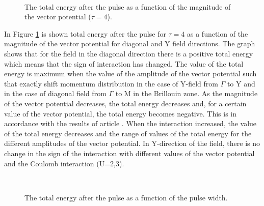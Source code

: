 \begin{figure}[h!]
 \\
\caption{The total energy after the pulse as a function of the magnitude of the vector potential ($\tau = 4$).}
\label{fig:E_tot_A}
\end{figure}

In Figure \ref{fig:E_tot_A} is shown total energy after the pulse for $\tau=4$ as a function of the magnitude of the vector potential for diagonal and Y field directions. The graph shows that for the field in the diagonal direction there is a positive total energy which means that the sign of interaction has changed. The value of the total energy is maximum when the value of the amplitude of the vector potential such that exactly shift momentum distribution in the case of Y-field from $\Gamma$ to Y and in the case of diagonal field from $\Gamma$ to M in the Brillouin zone.
As the magnitude of the vector potential decreases, the total energy decreases and, for a certain value of the vector potential, the total energy becomes negative. This is in accordance with the results of article \citet{PhysRevB.85.155124}. When the interaction increased, the value of the total energy decreases and the range of values of the total energy for the different amplitudes of the vector potential. In Y-direction of the field, there is no change in the sign of the interaction with different values of the vector potential and the Coulomb interaction (U=2,3).


\begin{figure}[h!]
 \\
\caption{The total energy after the pulse as a function of the pulse width.}
\label{fig:E_tot_tau}
\end{figure}

